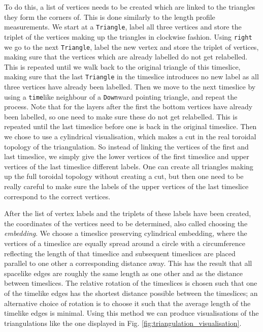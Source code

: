 To do this, a list of vertices needs to be created which are linked to the triangles they form the corners of.
This is done similarly to the length profile measurements.
We start at a \verb|Triangle|, label all three vertices and store the triplet of the vertices making up the triangles in clockwise fashion.
Using \verb|right| we go to the next \verb|Triangle|, label the new vertex and store the triplet of vertices, making sure that the vertices which are already labelled do not get relabelled.
This is repeated until we walk back to the original triangle of this timeslice, making sure that the last \verb|Triangle| in the timeslice introduces no new label as all three vertices have already been labelled.
Then we move to the next timeslice by using a \verb|time|like neighbour of a \verb|Down|ward pointing triangle, and repeat the process.
Note that for the layers after the first the bottom vertices have already been labelled, so one need to make sure these do not get relabelled.
This is repeated until the last timeslice before one is back in the original timeslice.
Then we chose to use a cylindrical visualisation, which makes a cut in the real toroidal topology of the triangulation. So instead of linking the vertices of the first and last timeslice, we simply give the lower vertices of the first timeslice and upper vertices of the last timeslice different labels.
One can create all triangles making up the full toroidal topology without creating a cut, but then one need to be really careful to make sure the labels of the upper vertices of the last timeslice correspond to the correct vertices.

After the list of vertex labels and the triplets of these labels have been created, the coordinates of the vertices need to be determined, also called choosing the \emph{embedding}.
We choose a timeslice preserving cylindrical embedding, where the vertices of a timeslice are equally spread around a circle with a circumference reflecting the length of that timeslice and subsequent timeslices are placed parallel to one other a corresponding distance away.
This has the result that all spacelike edges are roughly the same length as one other and as the distance between timeslices. The relative rotation of the timeslices is chosen such that one of the timelike edges has the shortest distance possible between the timeslices; an alternative choice of rotation is to choose it such that the average length of the timelike edges is minimal.
Using this method we can produce visualisations of the triangulations like the one
displayed in Fig. \ref{fig:triangulation_visualisation}.


